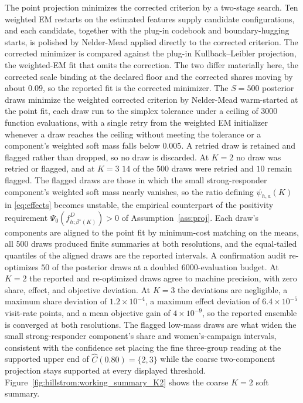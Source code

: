 \documentclass[11pt]{article}
\begin{document}
The point projection minimizes the corrected criterion by a two-stage search. Ten weighted EM restarts on the estimated features supply candidate configurations, and each candidate, together with the plug-in codebook and boundary-hugging starts, is polished by Nelder-Mead applied directly to the corrected criterion. The corrected minimizer is compared against the plug-in Kullback--Leibler projection, the weighted-EM fit that omits the correction. The two differ materially here, the corrected scale binding at the declared floor and the corrected shares moving by about $0.09$, so the reported fit is the corrected minimizer. The $S=500$ posterior draws minimize the weighted corrected criterion by Nelder-Mead warm-started at the point fit, each draw run to the simplex tolerance under a ceiling of $3000$ function evaluations, with a single retry from the weighted EM initializer whenever a draw reaches the ceiling without meeting the tolerance or a component's weighted soft mass falls below $0.005$. A retried draw is retained and flagged rather than dropped, so no draw is discarded. At $K=2$ no draw was retried or flagged, and at $K=3$ $14$ of the $500$ draws were retried and $10$ remain flagged. The flagged draws are those in which the small strong-responder component's weighted soft mass nearly vanishes, so the ratio defining $\psi_{h,a}(K)$ in \eqref{eq:effects} becomes unstable, the empirical counterpart of the positivity requirement $\Psi_0(f^D_{h;\beta^\star(K)})>0$ of Assumption~\ref{ass:proj}. Each draw's components are aligned to the point fit by minimum-cost matching on the means, all $500$ draws produced finite summaries at both resolutions, and the equal-tailed quantiles of the aligned draws are the reported intervals. A confirmation audit re-optimizes $50$ of the posterior draws at a doubled $6000$-evaluation budget. At $K=2$ the reported and re-optimized draws agree to machine precision, with zero share, effect, and objective deviation. At $K=3$ the deviations are negligible, a maximum share deviation of $1.2\times10^{-4}$, a maximum effect deviation of $6.4\times10^{-5}$ visit-rate points, and a mean objective gain of $4\times10^{-9}$, so the reported ensemble is converged at both resolutions. The flagged low-mass draws are what widen the small strong-responder component's share and women's-campaign intervals, consistent with the confidence set placing the fine three-group reading at the supported upper end of $\widehat C(0.80)=\{2,3\}$ while the coarse two-component projection stays supported at every displayed threshold. Figure~\ref{fig:hillstrom:working_summary_K2} shows the coarse $K=2$ soft summary.
\end{document}
